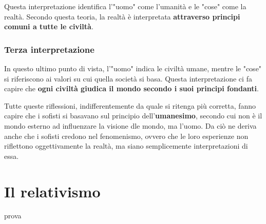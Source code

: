 \documentclass[10pt,a4paper]{article}
\begin{document}
	Questa interpretazione identifica l'"uomo" come l'umanità e le "cose" come la realtà. Secondo questa teoria, la realtà è interpretata \textbf{attraverso principi comuni a tutte le civiltà}.
	
	\subsubsection{Terza interpretazione}
	
	In questo ultimo punto di vista, l'"uomo" indica le civiltà umane, mentre le "cose" si riferiscono ai valori su cui quella società si basa. Questa interpretazione ci fa capire che \textbf{ogni civiltà giudica il mondo secondo i suoi principi fondanti}.
	
	Tutte queste riflessioni, indifferentemente da quale si ritenga più corretta, fanno capire che i sofisti si basavano sul principio dell'\textbf{umanesimo}, secondo cui non è il mondo esterno ad influenzare la visione dle mondo, ma l'uomo. Da ciò ne deriva anche che i sofisti credono nel fenomenismo, ovvero che le loro esperienze non riflettono oggettivamente la realtà, ma siano semplicemente interpretazioni di essa.
	
	\section{Il relativismo}
	
	prova
		   
	
\end{document}
